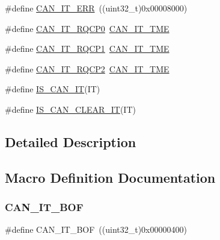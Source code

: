 \begin{DoxyCompactItemize}
\item 
\#define \hyperlink{group___c_a_n__interrupts_ga65f1781c9165a2e9b5f77f1ed3990741}{C\+A\+N\+\_\+\+I\+T\+\_\+\+E\+RR}~((uint32\+\_\+t)0x00008000)
\item 
\#define \hyperlink{group___c_a_n__interrupts_ga0c57058d6d14b2baa24a4895975b1371}{C\+A\+N\+\_\+\+I\+T\+\_\+\+R\+Q\+C\+P0}~\hyperlink{group___c_a_n__interrupts_ga619e36230fa2eb089a7c1936b5004eb9}{C\+A\+N\+\_\+\+I\+T\+\_\+\+T\+ME}
\item 
\#define \hyperlink{group___c_a_n__interrupts_ga42e5c8e89e0f06f3250916fcfb21dc22}{C\+A\+N\+\_\+\+I\+T\+\_\+\+R\+Q\+C\+P1}~\hyperlink{group___c_a_n__interrupts_ga619e36230fa2eb089a7c1936b5004eb9}{C\+A\+N\+\_\+\+I\+T\+\_\+\+T\+ME}
\item 
\#define \hyperlink{group___c_a_n__interrupts_gacc634c3e29cdc9622081021dcda3127b}{C\+A\+N\+\_\+\+I\+T\+\_\+\+R\+Q\+C\+P2}~\hyperlink{group___c_a_n__interrupts_ga619e36230fa2eb089a7c1936b5004eb9}{C\+A\+N\+\_\+\+I\+T\+\_\+\+T\+ME}
\item 
\#define \hyperlink{group___c_a_n__interrupts_gac0a9467bb0028c5fcd15a8a0ec6aaecb}{I\+S\+\_\+\+C\+A\+N\+\_\+\+IT}(IT)
\item 
\#define \hyperlink{group___c_a_n__interrupts_ga8b6e5fd6ddfe0141925f1e22cfbe7b85}{I\+S\+\_\+\+C\+A\+N\+\_\+\+C\+L\+E\+A\+R\+\_\+\+IT}(IT)
\end{DoxyCompactItemize}


\subsection{Detailed Description}


\subsection{Macro Definition Documentation}
\mbox{\label{group___c_a_n__interrupts_gad63c39e6237aa07681a1f8ce2ff9e167}} 
\subsubsection{\texorpdfstring{C\+A\+N\+\_\+\+I\+T\+\_\+\+B\+OF}{CAN\_IT\_BOF}}
{\footnotesize\ttfamily \#define C\+A\+N\+\_\+\+I\+T\+\_\+\+B\+OF~((uint32\+\_\+t)0x00000400)}

